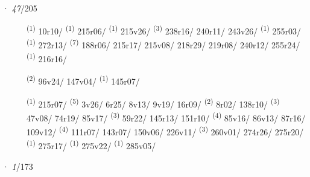 \noindent{} · \textit{47}/205 \LEMMALINE
\begin{description}
    \item[]  \textsuperscript{(1)} \mbox{10r10/} \textsuperscript{(1)} \mbox{215r06/} \textsuperscript{(1)} \mbox{215v26/} \textsuperscript{(3)} \mbox{238r16/} \mbox{240r11/} \mbox{243v26/} \textsuperscript{(1)} \mbox{255r03/} \textsuperscript{(1)} \mbox{272r13/} \CASEBREAK {} \textsuperscript{(7)} \mbox{188r06/} \mbox{215r17/} \mbox{215v08/} \mbox{218r29/} \mbox{219r08/} \mbox{240r12/} \mbox{255r24/} \textsuperscript{(1)} \mbox{216r16/}
    \item[]  \textsuperscript{(2)} \mbox{96v24/} \mbox{147v04/} \textsuperscript{(1)} \mbox{145r07/}
    \item[]  \textsuperscript{(1)} \mbox{215r07/} \CASEBREAK {} \textsuperscript{(5)} \mbox{3v26/} \mbox{6r25/} \mbox{8v13/} \mbox{9v19/} \mbox{16r09/} \textsuperscript{(2)} \mbox{8r02/} \mbox{138r10/} \textsuperscript{(3)} \mbox{47v08/} \mbox{74r19/} \mbox{85v17/} \textsuperscript{(3)} \mbox{59r22/} \mbox{145r13/} \mbox{151r10/} \textsuperscript{(4)} \mbox{85v16/} \mbox{86v13/} \mbox{87r16/} \mbox{109v12/} \textsuperscript{(4)} \mbox{111r07/} \mbox{143r07/} \mbox{150v06/} \mbox{226v11/} \textsuperscript{(3)} \mbox{260v01/} \mbox{274r26/} \mbox{275r20/} \textsuperscript{(1)} \mbox{275r17/} \textsuperscript{(1)} \mbox{275v22/} \textsuperscript{(1)} \mbox{285v05/}
\end{description}
\ENTRYEND
\noindent{} · \textit{1}/173 \LEMMALINE
